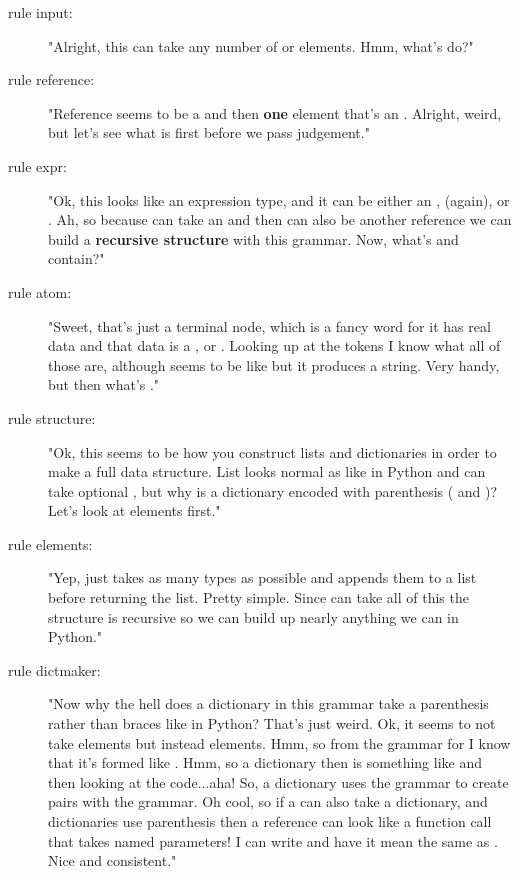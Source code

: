 \begin{description}
\item[rule input:] "Alright, this can take any number of  or
     elements.  Hmm, what's  do?"
\item[rule reference:] "Reference seems to be a  and then {\bf one} element
    that's an .  Alright, weird, but let's see what  is
    first before we pass judgement."
\item[rule expr:] "Ok, this looks like an expression type, and it can be either an
    ,  (again), or .  Ah, so
    because  can take an  and then  can
    also be another reference we can build a {\bf recursive structure} with this
    grammar.  Now, what's  and  contain?"
\item[rule atom:] "Sweet, that's just a terminal node, which is a fancy word for it has
    real data and that data is a ,  or .
    Looking up at the tokens I know what all of those are, although
     seems to be like  but it produces a
    string.  Very handy, but then what's ."
\item[rule structure:] "Ok, this seems to be how you construct lists and dictionaries
    in order to make a full data structure.  List looks normal as like in Python
    and can take optional , but why is a dictionary encoded with
    parenthesis ( and )?  Let's look at elements first."
\item[rule elements:] "Yep, just takes as many  types as possible and
    appends them to a list before returning the list.  Pretty simple.  Since
     can take all of this the structure is recursive so we can build
    up nearly anything we can in Python."
\item[rule dictmaker:] "Now why the hell does a dictionary in this grammar take a
    parenthesis rather than braces like in Python?  That's just weird.  Ok, it
    seems to not take  elements but instead 
    elements.  Hmm, so from the grammar for  I know that it's
    formed like .  Hmm, so a dictionary then is something 
    like  and then looking at the
    code...aha!  So, a dictionary uses the  grammar to create
     pairs with the  grammar.  Oh cool, so if a
     can also take a dictionary, and dictionaries use
    parenthesis then a reference can look like a function call that takes named
    parameters!  I can write  and have it mean the same as .  Nice and consistent."
\end{description}

